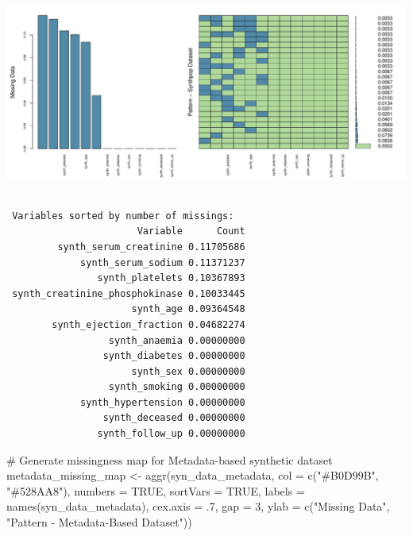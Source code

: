 \documentclass[
  letterpaper,
  DIV=11,
  numbers=noendperiod]{scrartcl}
\newenvironment{Shaded}{\begin{snugshade}}{\end{snugshade}}
\newcommand{\AttributeTok}[1]{\textcolor[rgb]{0.40,0.45,0.13}{#1}}
\newcommand{\CommentTok}[1]{\textcolor[rgb]{0.37,0.37,0.37}{#1}}
\newcommand{\ConstantTok}[1]{\textcolor[rgb]{0.56,0.35,0.01}{#1}}
\newcommand{\DecValTok}[1]{\textcolor[rgb]{0.68,0.00,0.00}{#1}}
\newcommand{\FunctionTok}[1]{\textcolor[rgb]{0.28,0.35,0.67}{#1}}
\newcommand{\NormalTok}[1]{\textcolor[rgb]{0.00,0.23,0.31}{#1}}
\newcommand{\OtherTok}[1]{\textcolor[rgb]{0.00,0.23,0.31}{#1}}
\newcommand{\StringTok}[1]{\textcolor[rgb]{0.13,0.47,0.30}{#1}}
\begin{document}
\begin{center}
\includegraphics[width=1\linewidth,height=\textheight,keepaspectratio]{heart_failure_synthetic_data_project_files/figure-pdf/Missingness Maps-4.pdf}
\end{center}

\begin{verbatim}

 Variables sorted by number of missings: 
                       Variable      Count
         synth_serum_creatinine 0.11705686
             synth_serum_sodium 0.11371237
                synth_platelets 0.10367893
 synth_creatinine_phosphokinase 0.10033445
                      synth_age 0.09364548
        synth_ejection_fraction 0.04682274
                  synth_anaemia 0.00000000
                 synth_diabetes 0.00000000
                      synth_sex 0.00000000
                  synth_smoking 0.00000000
             synth_hypertension 0.00000000
                 synth_deceased 0.00000000
                synth_follow_up 0.00000000
\end{verbatim}

\begin{Shaded}
\begin{Highlighting}[]
\CommentTok{\# Generate missingness map for Metadata{-}based synthetic dataset}
\NormalTok{metadata\_missing\_map }\OtherTok{\textless{}{-}} \FunctionTok{aggr}\NormalTok{(syn\_data\_metadata, }\AttributeTok{col =} \FunctionTok{c}\NormalTok{(}\StringTok{"\#B0D99B"}\NormalTok{, }\StringTok{"\#528AA8"}\NormalTok{),}
                             \AttributeTok{numbers =} \ConstantTok{TRUE}\NormalTok{, }\AttributeTok{sortVars =} \ConstantTok{TRUE}\NormalTok{,}
                             \AttributeTok{labels =} \FunctionTok{names}\NormalTok{(syn\_data\_metadata), }\AttributeTok{cex.axis =}\NormalTok{ .}\DecValTok{7}\NormalTok{,}
                             \AttributeTok{gap =} \DecValTok{3}\NormalTok{, }\AttributeTok{ylab =} \FunctionTok{c}\NormalTok{(}\StringTok{"Missing Data"}\NormalTok{, }\StringTok{"Pattern {-} Metadata{-}Based Dataset"}\NormalTok{))}
\end{Highlighting}
\end{Shaded}
\end{document}
